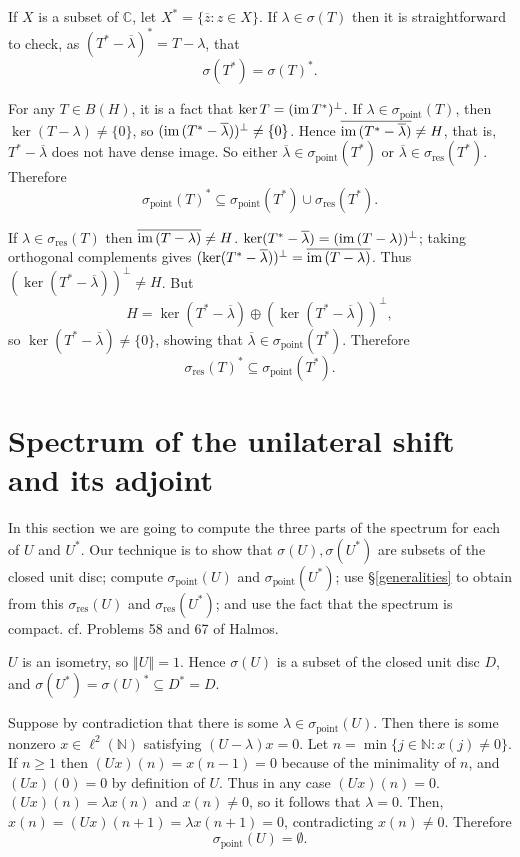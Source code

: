 \documentclass{article}
\newcommand{\im}{\textrm{im\,}}
\newcommand{\point}{\sigma_{\textrm{point}}}
\newcommand{\residual}{\sigma_{\textrm{res}}}
\newcommand{\norm}[1]{\left\Vert #1 \right\Vert}
\begin{document}
If $X$ is a subset of $\mathbb{C}$, let $X^*=\{\overline{z}:z \in X\}$. If $\lambda \in \sigma(T)$ then it is straightforward to check, as $(T^*-\overline{\lambda})^*=T-\lambda$, that
\[
\sigma(T^*)=\sigma(T)^*.
\]

For any $T \in B(H)$, it is a fact that $\ker T = (\im T^*)^\perp$. 
If $\lambda \in \point(T)$, then $\ker (T-\lambda) \neq \{0\}$, so $(\im (T^*-\overline{\lambda}))^\perp \neq \{0\}$. Hence
$\overline{\im (T^*-\overline{\lambda})} \neq H$, that is, $T^*-\overline{\lambda}$ does not have dense image. So either $\overline{\lambda}
\in \point(T^*)$ or $\overline{\lambda} \in \residual(T^*)$. Therefore
\[
\point(T)^* \subseteq \point(T^*) \cup \residual(T^*).
\]

If $\lambda \in \residual(T)$ then $\overline{\im(T-\lambda)} \neq H$. 
$\ker(T^*-\overline{\lambda})=(\im (T-\lambda))^\perp$; taking orthogonal complements gives
$(\ker(T^*-\overline{\lambda}))^\perp = \overline{\im (T-\lambda)}$. Thus $(\ker(T^*-\overline{\lambda}))^\perp \neq H$. But
\[
H=\ker(T^*-\overline{\lambda}) \oplus (\ker(T^*-\overline{\lambda}))^\perp,
\]
so $\ker(T^*-\overline{\lambda}) \neq \{0\}$, showing that $\overline{\lambda} \in \point(T^*)$. Therefore
\[
\residual(T)^* \subseteq \point(T^*).
\]



\section{Spectrum of the unilateral shift and its adjoint}
In this section we are going to compute the three parts of the spectrum for each of $U$ and $U^*$. Our technique
is to show that $\sigma(U),\sigma(U^*)$ are subsets of the closed unit disc; compute $\point(U)$ and $\point(U^*)$; use \S \ref{generalities} to obtain
from this $\residual(U)$ and $\residual(U^*)$; and
use the fact that the spectrum is compact.
cf. Problems 58 and 67 of Halmos.

 $U$ is an isometry, so $\norm{U}=1$. Hence $\sigma(U)$ is a subset of the closed unit disc $D$,
and $\sigma(U^*)=\sigma(U)^* \subseteq D^*=D$.

Suppose by contradiction that there is some $\lambda \in \point(U)$. Then there is some nonzero $x \in \ell^2(\mathbb{N})$
satisfying $(U-\lambda)x=0$. Let $n=\min\{j \in \mathbb{N}: x(j) \neq 0\}$. If $n \geq 1$ then $(Ux)(n)=x(n-1)=0$ because of the minimality of $n$, 
and $(Ux)(0)=0$ by definition of $U$. Thus in any case $(Ux)(n)=0$. 
$(Ux)(n)=\lambda x(n)$ and $x(n) \neq 0$, so it follows that $\lambda=0$. Then,
$x(n)=(Ux)(n+1)=\lambda x(n+1)=0$,
contradicting  $x(n) \neq 0$. Therefore
\[
\point(U) = \emptyset.
\]
\end{document}
